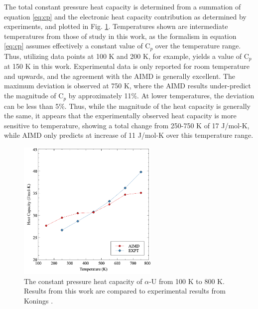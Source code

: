 \documentclass[review]{elsarticle}
\begin{document}
\FloatBarrier

The total constant pressure heat capacity is determined from a summation of equation \ref{eq:cp} and the electronic heat capacity contribution as determined by experiments, and plotted in Fig. \ref{fig:cp}. Temperatures shown are intermediate temperatures from those of study in this work, as the formalism in equation \ref{eq:cp} assumes effectively a constant value of C$_p$ over the temperature range. Thus, utilizing data points at 100 K and 200 K, for example, yields a value of C$_p$ at 150 K in this work. Experimental data is only reported for room temperature and upwards, and the agreement with the AIMD is generally excellent. The maximum deviation is observed at 750 K, where the AIMD results under-predict the magnitude of C$_p$ by approximately 11\%. At lower temperatures, the deviation can be less than 5\%. Thus, while the magnitude of the heat capacity is generally the same, it appears that the experimentally observed heat capacity is more sensitive to temperature, showing a total change from 250-750 K of 17 J/mol-K, while AIMD only predicts at increase of 11 J/mol-K over this temperature range. 

 \begin{figure}[hbt]
	\centering
	\includegraphics[width=0.6\textwidth]{fig_cp.png}
    \caption{The constant pressure heat capacity of $\alpha$-U from 100 K to 800 K. Results from this work are compared to experimental results from Konings \cite{konings2010}.}\label{fig:cp}
\end{figure}

\FloatBarrier
\end{document}
